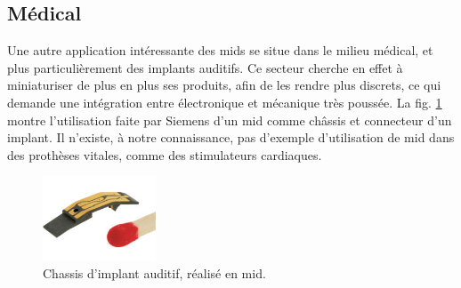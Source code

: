 \subsection{Médical}
Une autre application intéressante des \glspl{mid} se situe dans le milieu médical, et plus particulièrement des implants auditifs.
Ce secteur cherche en effet à miniaturiser de plus en plus ses produits, afin de les rendre plus discrets, ce qui demande une intégration entre électronique et mécanique très poussée.
La fig. \ref{fig:mid-siemens-example} montre l'utilisation faite par Siemens d'un \gls{mid} comme châssis et connecteur d'un implant.
Il n'existe, à notre connaissance, pas d'exemple d'utilisation de \gls{mid} dans des prothèses vitales, comme des stimulateurs cardiaques.


\begin{figure}[h]
    \begin{center}
        \includegraphics[width=0.3\textwidth]{images/mid-hearing-aid_RED}
        \caption{Chassis d'implant auditif, réalisé en \gls{mid}.}
        \label{fig:mid-siemens-example}
    \end{center}
\end{figure}

